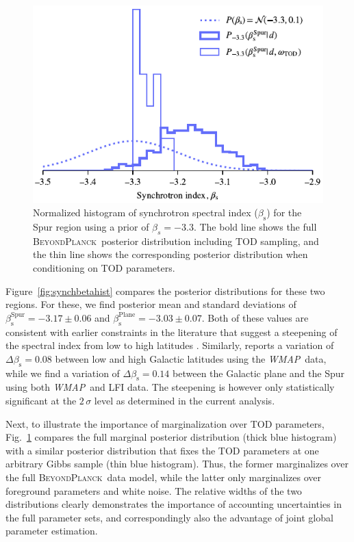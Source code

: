 \documentclass[twocolumn]{aa}
\def\WMAP{\textit{WMAP}}
\newcommand{\BP}{\textsc{BeyondPlanck}}
\newcommand{\?}[1]{\textcolor{red}{{\bf [#1]}}}
\begin{document}
\begin{figure}[t]
  \center
  \vspace*{0.25mm}
  \includegraphics[width=\linewidth]{figs/synch-beta_pixreg_val_spur_marginalized_histogram_moresamp.pdf}
  \caption{Normalized histogram of synchrotron spectral index
    ($\beta_{\mathrm s}$) for the Spur region using a prior of
    $\beta_{s}=-3.3$. The bold line shows the full
    \BP\ posterior distribution including TOD sampling, and the thin
    line shows the corresponding posterior distribution when conditioning on TOD parameters.}
  \label{fig:synchbetaspurmarghist}
  \end{figure} 

Figure~\ref{fig:synchbetahist} compares the posterior distributions for these
two regions. For these, we find posterior mean and standard deviations of
${\beta_{\mathrm s}^{\mathrm{Spur}}=-3.17\pm0.06}$ and ${\beta_{\mathrm
s}^{\mathrm{Plane}}=-3.03\pm0.07}$. Both of these values are consistent with
earlier constraints in the literature that suggest a steepening of the
spectral index from low to high latitudes \citep[e.g.,][]{fuskeland:2019, krachmalnicoff2018}. Similarly,
\citet{dunkley2009} reports a variation of $\Delta\beta_{\mathrm s}=0.08$
between low and high Galactic latitudes using the \WMAP\ data, while we find a
variation of $\Delta\beta_{\mathrm s}=0.14$ between the Galactic plane and the
Spur using both \WMAP\ and LFI data. The steepening is however only
statistically significant at the $2\,\sigma$ level as determined in the current analysis. 

Next, to illustrate the importance of marginalization over TOD
parameters, Fig.~\ref{fig:synchbetaspurmarghist} compares the full
marginal posterior distribution (thick blue histogram) with a similar
posterior distribution that fixes the TOD parameters at one arbitrary
Gibbs sample (thin blue histogram). Thus, the former marginalizes over
the full \BP\ data model, while the latter only marginalizes over
foreground parameters and white noise. The relative widths of the two
distributions clearly demonstrates the importance of accounting
uncertainties in the full parameter sets, and correspondingly also the
advantage of joint global parameter estimation.
\end{document}
